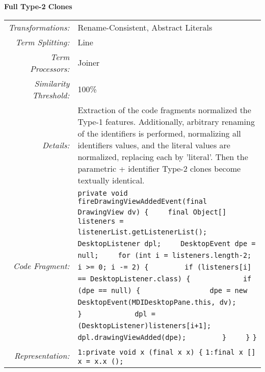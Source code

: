 \documentclass[]{article}
\begin{document}
	\noindent\begin{minipage}{\textwidth}
		\noindent \textbf{Full Type-2 Clones}\\
		\begin{tabular}{rp{12.5cm}}
			\bottomrule[2pt]
			\textit{Transformations:} & Rename-Consistent, Abstract Literals \\
			\textit{Term Splitting:}  & Line\\
			\textit{Term Processors:} & Joiner \\
			\textit{Similarity Threshold:} & 100\% \\
			\midrule
			\textit{Details:}         & Extraction of the code fragments normalized the Type-1 features.  Additionally, arbitrary renaming of the identifiers is performed, normalizing all identifiers values, and the literal values are normalized, replacing each by 'literal'.  Then the parametric + identifier Type-2 clones become textually identical.\\
			\midrule
			\textit{Code Fragment:} &
			\verb|private void fireDrawingViewAddedEvent(final DrawingView dv) {|\newline
			\verb|    final Object[] listeners = listenerList.getListenerList();|\newline
			\verb|    DesktopListener dpl;|\newline
			\verb|    DesktopEvent dpe = null;|\newline
			\verb|    for (int i = listeners.length-2; i >= 0; i -= 2) {|\newline
			\verb|        if (listeners[i] == DesktopListener.class) {|\newline
			\verb|            if (dpe == null) {|\newline
			\verb|                dpe = new DesktopEvent(MDIDesktopPane.this, dv);|\newline
			\verb|            }|\newline
			\verb|            dpl = (DesktopListener)listeners[i+1];|\newline
			\verb|            dpl.drawingViewAdded(dpe);|\newline
			\verb|        }|\newline
			\verb|    }|\newline
			\verb|}|\newline
			\\
			\textit{Representation:} & 
			\verb|1:private void x (final x x) {|\newline
			\verb|1:final x [] x = x.x ();|\newline

\end{tabular}
\end{minipage}
\end{document}
